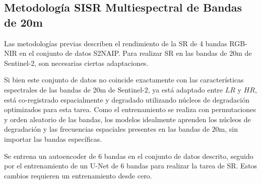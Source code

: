 \subsection{Metodología SISR Multiespectral de Bandas de 20m}
Las metodologías previas describen el rendimiento de la SR de 4 bandas RGB-NIR en el conjunto de datos S2NAIP. Para realizar SR en las bandas de 20m de Sentinel-2, son necesarias ciertas adaptaciones. 

Si bien este conjunto de datos no coincide exactamente con las características espectrales de las bandas de 20m de Sentinel-2, ya está adaptado entre $LR$ y $HR$, está co-registrado espacialmente y degradado utilizando núcleos de degradación optimizados para esta tarea. Como el entrenamiento se realiza con permutaciones y orden aleatorio de las bandas, los modelos idealmente aprenden los núcleos de degradación y las frecuencias espaciales presentes en las bandas de 20m, sin importar las bandas específicas.

Se entrena un autoencoder de 6 bandas en el conjunto de datos descrito, seguido por el entrenamiento de un U-Net de 6 bandas para realizar la tarea de SR. Estos cambios requieren un entrenamiento desde cero. 


